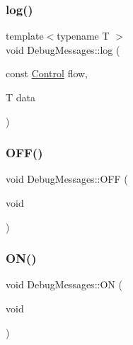 \mbox{\label{class_debug_messages_accb5bd318d0b085aa1824ddd7b1bd31e}} 
\subsubsection{\texorpdfstring{log()}{log()}\hspace{0.1cm}{\footnotesize\ttfamily [2/2]}}
{\footnotesize\ttfamily template$<$typename T $>$ \\
void Debug\+Messages\+::log (\begin{DoxyParamCaption}\item[{const \mbox{\hyperlink{_debug_messages_8h_a0da83e35f29c11f7f3c637234f2149f9}{Control}}}]{flow,  }\item[{T}]{data }\end{DoxyParamCaption})\hspace{0.3cm}{\ttfamily [inline]}}

\mbox{\label{class_debug_messages_ac1e4085ade0d1ff7b603fd8205f74b7c}} 
\subsubsection{\texorpdfstring{O\+F\+F()}{OFF()}}
{\footnotesize\ttfamily void Debug\+Messages\+::\+O\+FF (\begin{DoxyParamCaption}\item[{void}]{ }\end{DoxyParamCaption})}

\mbox{\label{class_debug_messages_a95866775dcf301773daa7bed529c557e}} 
\subsubsection{\texorpdfstring{O\+N()}{ON()}}
{\footnotesize\ttfamily void Debug\+Messages\+::\+ON (\begin{DoxyParamCaption}\item[{void}]{ }\end{DoxyParamCaption})}




